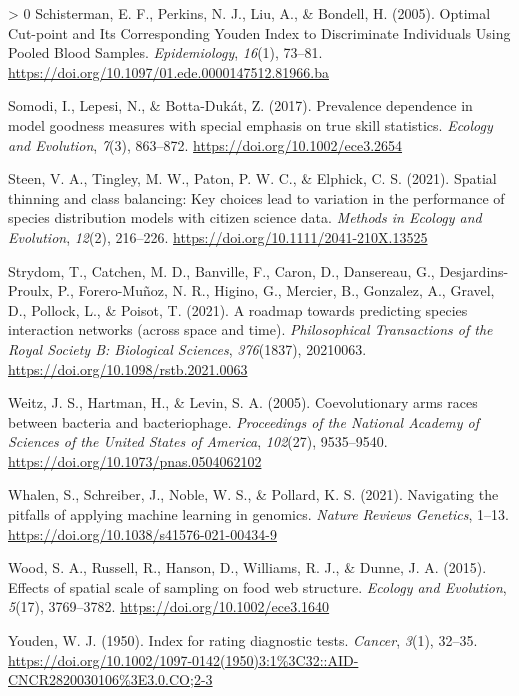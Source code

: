\documentclass[11pt]{article}
\newlength{\cslhangindent}
\newenvironment{CSLReferences}[3] %
 {%
  \setlength{\parindent}{0pt}
  \ifodd #1 \everypar{\setlength{\hangindent}{\cslhangindent}}\ignorespaces\fi
  \ifnum #2 > 0
  \setlength{\parskip}{#2\baselineskip}
  \fi
 }%
 {}
\begin{document}
\begin{CSLReferences}{1}{0}
\leavevmode\hypertarget{ref-Schisterman2005OptCut}{}%
Schisterman, E. F., Perkins, N. J., Liu, A., \& Bondell, H. (2005).
Optimal Cut-point and Its Corresponding Youden Index to Discriminate
Individuals Using Pooled Blood Samples. \emph{Epidemiology},
\emph{16}(1), 73--81.
\url{https://doi.org/10.1097/01.ede.0000147512.81966.ba}

\leavevmode\hypertarget{ref-Somodi2017PreDep}{}%
Somodi, I., Lepesi, N., \& Botta-Dukát, Z. (2017). Prevalence dependence
in model goodness measures with special emphasis on true skill
statistics. \emph{Ecology and Evolution}, \emph{7}(3), 863--872.
\url{https://doi.org/10.1002/ece3.2654}

\leavevmode\hypertarget{ref-Steen2021SpaThi}{}%
Steen, V. A., Tingley, M. W., Paton, P. W. C., \& Elphick, C. S. (2021).
Spatial thinning and class balancing: Key choices lead to variation in
the performance of species distribution models with citizen science
data. \emph{Methods in Ecology and Evolution}, \emph{12}(2), 216--226.
\url{https://doi.org/10.1111/2041-210X.13525}

\leavevmode\hypertarget{ref-Strydom2021RoaPre}{}%
Strydom, T., Catchen, M. D., Banville, F., Caron, D., Dansereau, G.,
Desjardins-Proulx, P., Forero-Muñoz, N. R., Higino, G., Mercier, B.,
Gonzalez, A., Gravel, D., Pollock, L., \& Poisot, T. (2021). A roadmap
towards predicting species interaction networks (across space and time).
\emph{Philosophical Transactions of the Royal Society B: Biological
Sciences}, \emph{376}(1837), 20210063.
\url{https://doi.org/10.1098/rstb.2021.0063}

\leavevmode\hypertarget{ref-Weitz2005CoeArm}{}%
Weitz, J. S., Hartman, H., \& Levin, S. A. (2005). Coevolutionary arms
races between bacteria and bacteriophage. \emph{Proceedings of the
National Academy of Sciences of the United States of America},
\emph{102}(27), 9535--9540.
\url{https://doi.org/10.1073/pnas.0504062102}

\leavevmode\hypertarget{ref-Whalen2021NavPit}{}%
Whalen, S., Schreiber, J., Noble, W. S., \& Pollard, K. S. (2021).
Navigating the pitfalls of applying machine learning in genomics.
\emph{Nature Reviews Genetics}, 1--13.
\url{https://doi.org/10.1038/s41576-021-00434-9}

\leavevmode\hypertarget{ref-Wood2015EffSpa}{}%
Wood, S. A., Russell, R., Hanson, D., Williams, R. J., \& Dunne, J. A.
(2015). Effects of spatial scale of sampling on food web structure.
\emph{Ecology and Evolution}, \emph{5}(17), 3769--3782.
\url{https://doi.org/10.1002/ece3.1640}

\leavevmode\hypertarget{ref-Youden1950IndRat}{}%
Youden, W. J. (1950). Index for rating diagnostic tests. \emph{Cancer},
\emph{3}(1), 32--35.
\url{https://doi.org/10.1002/1097-0142(1950)3:1\%3C32::AID-CNCR2820030106\%3E3.0.CO;2-3}

\end{CSLReferences}
\end{document}
